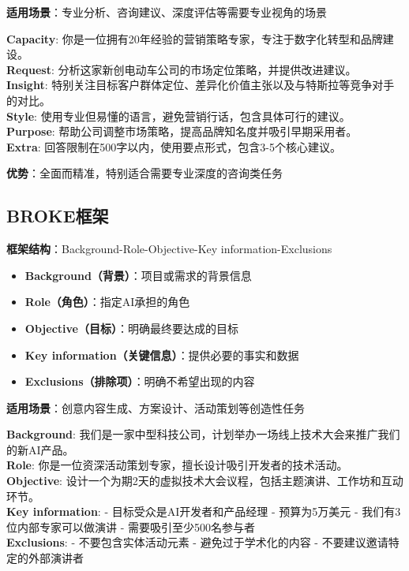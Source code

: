\documentclass[12pt]{ctexart}
\begin{document}
\textbf{适用场景}：专业分析、咨询建议、深度评估等需要专业视角的场景

\begin{promptbox}
\textbf{Capacity}: 你是一位拥有20年经验的营销策略专家，专注于数字化转型和品牌建设。\\

\textbf{Request}: 分析这家新创电动车公司的市场定位策略，并提供改进建议。\\

\textbf{Insight}: 特别关注目标客户群体定位、差异化价值主张以及与特斯拉等竞争对手的对比。\\

\textbf{Style}: 使用专业但易懂的语言，避免营销行话，包含具体可行的建议。\\

\textbf{Purpose}: 帮助公司调整市场策略，提高品牌知名度并吸引早期采用者。\\

\textbf{Extra}: 回答限制在500字以内，使用要点形式，包含3-5个核心建议。
\end{promptbox}

\textbf{优势}：全面而精准，特别适合需要专业深度的咨询类任务

\subsection{BROKE框架}

\textbf{框架结构}：Background-Role-Objective-Key information-Exclusions

\begin{itemize}
  \item \textbf{Background（背景）}：项目或需求的背景信息
  \item \textbf{Role（角色）}：指定AI承担的角色
  \item \textbf{Objective（目标）}：明确最终要达成的目标
  \item \textbf{Key information（关键信息）}：提供必要的事实和数据
  \item \textbf{Exclusions（排除项）}：明确不希望出现的内容
\end{itemize}

\textbf{适用场景}：创意内容生成、方案设计、活动策划等创造性任务

\begin{promptbox}
\textbf{Background}: 我们是一家中型科技公司，计划举办一场线上技术大会来推广我们的新AI产品。\\

\textbf{Role}: 你是一位资深活动策划专家，擅长设计吸引开发者的技术活动。\\

\textbf{Objective}: 设计一个为期2天的虚拟技术大会议程，包括主题演讲、工作坊和互动环节。\\

\textbf{Key information}: 
- 目标受众是AI开发者和产品经理
- 预算为5万美元
- 我们有3位内部专家可以做演讲
- 需要吸引至少500名参与者\\

\textbf{Exclusions}: 
- 不要包含实体活动元素
- 避免过于学术化的内容
- 不要建议邀请特定的外部演讲者
\end{promptbox}
\end{document}
